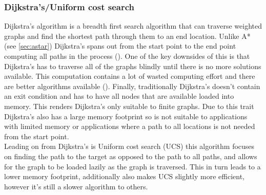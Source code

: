 \subsubsection{Dijkstra's/Uniform cost search}
Dijkstra’s algorithm is a breadth first search algorithm that can traverse weighted graphs and find the shortest path through them to an end location. Unlike A* (see \ref{sec:astar}) Dijkstra’s spans out from the start point to the end point computing all paths in the process (\cite{felner_2011_position}). One of the key downsides of this is that Dijkstra’s has to traverse all of the graphs blindly until there is no more solutions available. This computation contains a lot of wasted computing effort and there are better algorithms available (\cite{felner_2011_position}). Finally, traditionally Dijkstra's doesn't contain an exit condition and has to have all nodes that are available loaded into memory. This renders Dijkstra's only suitable to finite graphs. Due to this trait Dijkstra's also has a large memory footprint so is not suitable to applications with limited memory or applications where a path to all locations is not needed from the start point.\\
Leading on from Dijkstra's is Uniform cost search (UCS) this algorithm focuses on finding the path to the target as opposed to the path to all paths, and allows for the graph to be loaded lazily as the graph is traversed. This in turn leads to a lower memory footprint, additionally also makes UCS slightly more efficient, however it's still a slower algorithm to others.